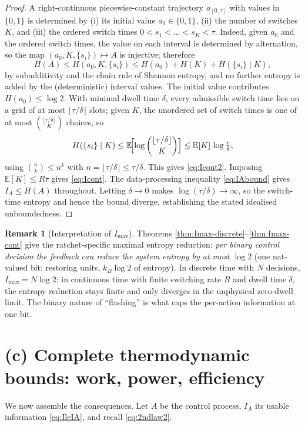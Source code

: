 \documentclass{amsart}
\theoremstyle{definition}
\newtheorem{remark}{Remark}
\newcommand{\E}{\mathbb{E}}
\newcommand{\kB}{k_{B}}
\begin{document}
\begin{proof}
A right-continuous piecewise-constant trajectory $a_{[0,\tau]}$ with values in
$\{0,1\}$ is determined by (i) its initial value $a_0\in\{0,1\}$, (ii) the
number of switches $K$, and (iii) the ordered switch times
$0<s_1<\dots<s_K<\tau$. Indeed, given $a_0$ and the ordered switch times, the
value on each interval is determined by alternation, so the map
$(a_0,K,\{s_i\})\mapsto A$ is injective; therefore
\[
H(A)\le H(a_0,K,\{s_i\})\le H(a_0)+H(K)+H(\{s_i\}\mid K),
\]
by subadditivity and the chain rule of Shannon entropy, and no further entropy
is added by the (deterministic) interval values. The initial value contributes
$H(a_0)\le\log2$. With minimal dwell time $\delta$, every admissible switch
time lies on a grid of at most $\lfloor\tau/\delta\rfloor$ slots; given $K$,
the unordered set of switch times is one of at most
$\binom{\lfloor\tau/\delta\rfloor}{K}$ choices, so
\[
H(\{s_i\}\mid K)\le \E\!\Bigl[\log\binom{\lfloor\tau/\delta\rfloor}{K}\Bigr]
\le \E[K]\,\log\tfrac{\tau}{\delta},
\]
using $\binom{n}{k}\le n^{k}$ with $n=\lfloor\tau/\delta\rfloor\le\tau/\delta$.
This gives \eqref{eq:Icont2}. Imposing $\E[K]\le R\tau$ gives \eqref{eq:Icont}.
The data-processing inequality \eqref{eq:IAbound} gives $I_A\le H(A)$
throughout. Letting $\delta\to0$ makes $\log(\tau/\delta)\to\infty$, so the
switch-time entropy and hence the bound diverge, establishing the stated
idealised unboundedness.
\end{proof}

\begin{remark}[Interpretation of $I_{\max}$]
Theorems \ref{thm:Imax-discrete}--\ref{thm:Imax-cont} give the
ratchet-specific maximal entropy reduction: \emph{per binary control decision
the feedback can reduce the system entropy by at most $\log 2$} (one nat-valued
bit; restoring units, $\kB\log2$ of entropy). In discrete time with $N$
decisions, $I_{\max}=N\log2$; in continuous time with finite switching rate
$R$ and dwell time $\delta$, the entropy reduction stays finite and only
diverges in the unphysical zero-dwell limit. The binary nature of ``flashing''
is what caps the per-action information at one bit.
\end{remark}

\section{(c) Complete thermodynamic bounds: work, power, efficiency}

We now assemble the consequences. Let $A$ be the control process, $I_A$ its
usable information \eqref{eq:IleIA}, and recall \eqref{eq:2ndlaw2}.
\end{document}
